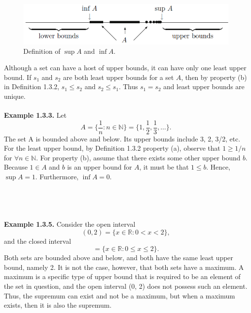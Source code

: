 \documentclass{article}
\begin{document}
        \begin{figure}[ht!]
            \centering \includegraphics[width=0.9\linewidth]{figs/infsup.png}
            \caption{Definition of $\sup A$ and $\inf A$.}
            \label{supinfA}
        \end{figure}
        Although a set can have a host of upper bounds, it can have only one least upper bound. If $s_1$ and $s_2$ are both least upper bounds for a set $A$, then by property (b) in Definition 1.3.2, $s_1 \leq s_2$ and $s_2 \leq s_1$. Thus $s_1 = s_2$ and least upper bounds are unique.
        \\ \\
        \textbf{Example 1.3.3.} Let 
        \begin{equation*}
            A = \bigg\{\frac{1}{n}:n \in \mathbb{N}\bigg\} = \bigg\{1,\frac{1}{2},\frac{1}{3},\dots\bigg\}.
        \end{equation*}
        The set A is bounded above and below. Its upper bounds include 3, 2, 3/2, etc. For the least upper bound, by Definition 1.3.2 property (a), observe that $1 \geq 1/n$ for $\forall n \in \mathbb{N}$. For property (b), assume that there exists some other upper bound $b$. Because $1 \in A$ and $b$ is an upper bound for $A$, it must be that $1 \leq b$. Hence, $\sup A = 1$. Furthermore, $\inf A = 0$.
        \\ \\
        \\ \\ \\
        \textbf{Example 1.3.5.} Consider the open interval
        \begin{equation*}
            (0,2) = \{x \in \mathbb{R}: 0 < x < 2\},
        \end{equation*}
        and the closed interval
        \begin{equation*}
            [0,2] = \{x \in \mathbb{R}: 0 \leq x \leq 2\}.
        \end{equation*}
        Both sets are bounded above and below, and both have the same least upper bound, namely 2. It is not the case, however, that both sets have a maximum. A maximum is a specific type of upper bound that is required to be an element of the set in question, and the open interval (0, 2) does not possess such an element. Thus, the supremum can exist and not be a maximum, but when a maximum exists, then it is also the supremum.\\
        
\end{document}
